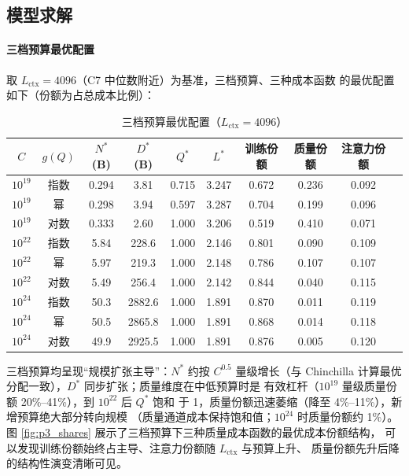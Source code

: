 \subsection{模型求解}

\paragraph{三档预算最优配置}

取 $L_{\text{ctx}}=4096$（C7 中位数附近）为基准，三档预算、三种成本函数
的最优配置如下（份额为占总成本比例）：

\begin{table}[htbp]
\centering
\caption{三档预算最优配置（$L_{\text{ctx}}=4096$）}
\begin{tabular}{c|c|ccccc|ccc}
\toprule
$C$ & $g(Q)$ & $N^{*}$(B) & $D^{*}$(B) & $Q^{*}$ & $L^{*}$ & 训练份额 & 质量份额 & 注意力份额 \\
\midrule
$10^{19}$ & 指数 & 0.294 & 3.81 & 0.715 & 3.247 & 0.672 & 0.236 & 0.092 \\
$10^{19}$ & 幂 & 0.298 & 3.94 & 0.597 & 3.287 & 0.704 & 0.199 & 0.096 \\
$10^{19}$ & 对数 & 0.333 & 2.60 & 1.000 & 3.206 & 0.519 & 0.410 & 0.071 \\
\midrule
$10^{22}$ & 指数 & 5.84 & 228.6 & 1.000 & 2.146 & 0.801 & 0.090 & 0.109 \\
$10^{22}$ & 幂 & 5.97 & 219.3 & 1.000 & 2.148 & 0.786 & 0.107 & 0.107 \\
$10^{22}$ & 对数 & 5.49 & 256.4 & 1.000 & 2.142 & 0.844 & 0.040 & 0.115 \\
\midrule
$10^{24}$ & 指数 & 50.3 & 2882.6 & 1.000 & 1.891 & 0.870 & 0.011 & 0.119 \\
$10^{24}$ & 幂 & 50.5 & 2865.8 & 1.000 & 1.891 & 0.868 & 0.014 & 0.118 \\
$10^{24}$ & 对数 & 49.9 & 2925.5 & 1.000 & 1.891 & 0.876 & 0.005 & 0.120 \\
\bottomrule
\end{tabular}
\end{table}

三档预算均呈现``规模扩张主导''：$N^{*}$ 约按 $C^{0.5}$ 量级增长（与
Chinchilla 计算最优分配一致），$D^{*}$ 同步扩张；质量维度在中低预算时是
有效杠杆（$10^{19}$ 量级质量份额 20\%--41\%），到 $10^{22}$ 后 $Q^{*}$ 饱和
于 1，质量份额迅速萎缩（降至 4\%--11\%），新增预算绝大部分转向规模
（质量通道成本保持饱和值；$10^{24}$ 时质量份额约 1\%）。图
\ref{fig:p3_shares} 展示了三档预算下三种质量成本函数的最优成本份额结构，
可以发现训练份额始终占主导、注意力份额随 $L_{\text{ctx}}$ 与预算上升、
质量份额先升后降的结构性演变清晰可见。

